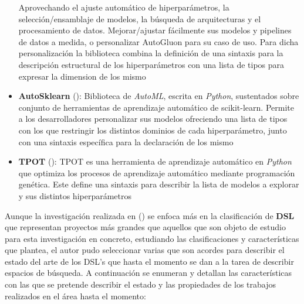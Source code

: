 \begin{itemize}
          Aprovechando el ajuste automático de hiperparámetros, la selección/ensamblaje de modelos,
          la búsqueda de arquitecturas y el procesamiento de datos. Mejorar/ajustar fácilmente sus
          modelos y pipelines de datos a medida, o personalizar AutoGluon para su caso de uso. Para
          dicha personalización la biblioteca combina la definición de una sintaxis para la descripción
          estructural de los hiperparámetros con una lista de tipos para expresar la dimension de los
          mismo
    \item {\bf AutoSklearn} (\cite{autosklearn}): Biblioteca de {\it AutoML}, escrita en {\it Python}, sustentados sobre
          conjunto de herramientas de aprendizaje automático de scikit-learn. Permite a los desarrolladores
          personalizar sus modelos ofreciendo una lista de tipos con los que restringir los distintos dominios
          de cada hiperparámetro, junto con una sintaxis específica para la declaración de los mismo
    \item {\bf TPOT} (\cite{tpot}): TPOT es una herramienta de aprendizaje automático en {\it Python} que optimiza los
          procesos de aprendizaje automático mediante programación genética. Este define una sintaxis para
          describir la lista de modelos a explorar y sus distintos hiperparámetros
\end{itemize}

Aunque la investigación realizada en (\cite{langlois2007dsl}) se enfoca más en la clasificación de {\bf DSL} que
representan proyectos más grandes que aquellos que son objeto de estudio para esta
investigación en concreto, estudiando las clasificaciones y características que plantea,
el autor pudo seleccionar varias que son acordes para describir el estado del arte
de los DSL's que hasta el momento se dan a la tarea de describir espacios de búsqueda.
A continuación se enumeran y detallan las características con las que se pretende
describir el estado y las propiedades de los trabajos realizados en el área hasta el
momento:

